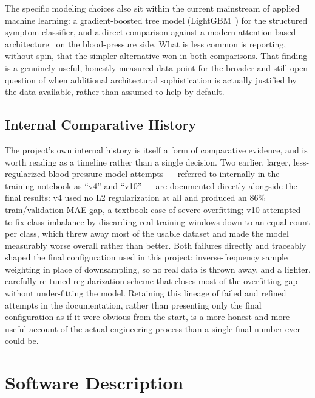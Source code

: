 \documentclass[12pt,a4paper]{report}
\begin{document}
The specific modeling choices also sit within the current mainstream of
applied machine learning: a gradient-boosted tree model
(LightGBM~\cite{lightgbm}) for the structured symptom classifier, and a direct
comparison against a modern attention-based architecture~\cite{attention} on
the blood-pressure side. What is less common is reporting, without spin, that
the simpler alternative won in both comparisons. That finding is a genuinely
useful, honestly-measured data point for the broader and still-open question
of when additional architectural sophistication is actually justified by the
data available, rather than assumed to help by default.

\section{Internal Comparative History}

The project's own internal history is itself a form of comparative evidence,
and is worth reading as a timeline rather than a single decision. Two earlier,
larger, less-regularized blood-pressure model attempts --- referred to
internally in the training notebook as ``v4'' and ``v10'' --- are documented
directly alongside the final results: v4 used no L2 regularization at all and
produced an 86\% train/validation MAE gap, a textbook case of severe
overfitting; v10 attempted to fix class imbalance by discarding real training
windows down to an equal count per class, which threw away most of the usable
dataset and made the model measurably worse overall rather than better. Both
failures directly and traceably shaped the final configuration used in this
project: inverse-frequency sample weighting in place of downsampling, so no
real data is thrown away, and a lighter, carefully re-tuned regularization
scheme that closes most of the overfitting gap without under-fitting the
model. Retaining this lineage of failed and refined attempts in the
documentation, rather than presenting only the final configuration as if it
were obvious from the start, is a more honest and more useful account of the
actual engineering process than a single final number ever could be.


\chapter{Software Description}
\end{document}
